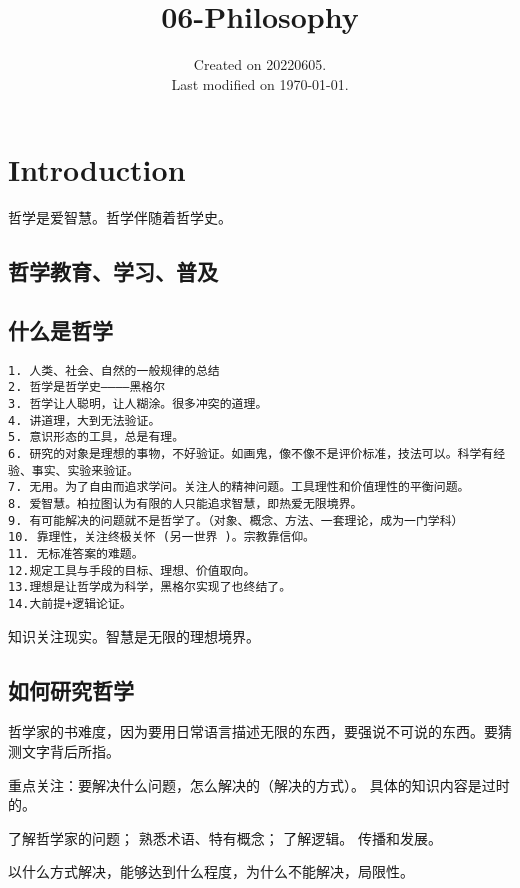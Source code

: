 \documentclass[UTF8]{../RepresentationUniverse}
\begin{document}
\title{06-Philosophy}
\date{Created on 20220605.\\   Last modified on \today.}
\maketitle
\tableofcontents


\chapter{Introduction}

哲学是爱智慧。哲学伴随着哲学史。

\section{哲学教育、学习、普及}


\section{什么是哲学}

\begin{lstlisting}
1. 人类、社会、自然的一般规律的总结
2. 哲学是哲学史————黑格尔
3. 哲学让人聪明，让人糊涂。很多冲突的道理。
4. 讲道理，大到无法验证。
5. 意识形态的工具，总是有理。
6. 研究的对象是理想的事物，不好验证。如画鬼，像不像不是评价标准，技法可以。科学有经验、事实、实验来验证。
7. 无用。为了自由而追求学问。关注人的精神问题。工具理性和价值理性的平衡问题。
8. 爱智慧。柏拉图认为有限的人只能追求智慧，即热爱无限境界。
9. 有可能解决的问题就不是哲学了。（对象、概念、方法、一套理论，成为一门学科）
10. 靠理性，关注终极关怀 (另一世界 )。宗教靠信仰。
11. 无标准答案的难题。
12.规定工具与手段的目标、理想、价值取向。
13.理想是让哲学成为科学，黑格尔实现了也终结了。
14.大前提+逻辑论证。
\end{lstlisting}

知识关注现实。智慧是无限的理想境界。

\section{如何研究哲学}

哲学家的书难度，因为要用日常语言描述无限的东西，要强说不可说的东西。要猜测文字背后所指。

重点关注：要解决什么问题，怎么解决的（解决的方式）。
具体的知识内容是过时的。

了解哲学家的问题；
熟悉术语、特有概念；
了解逻辑。
传播和发展。

以什么方式解决，能够达到什么程度，为什么不能解决，局限性。
\end{document}
